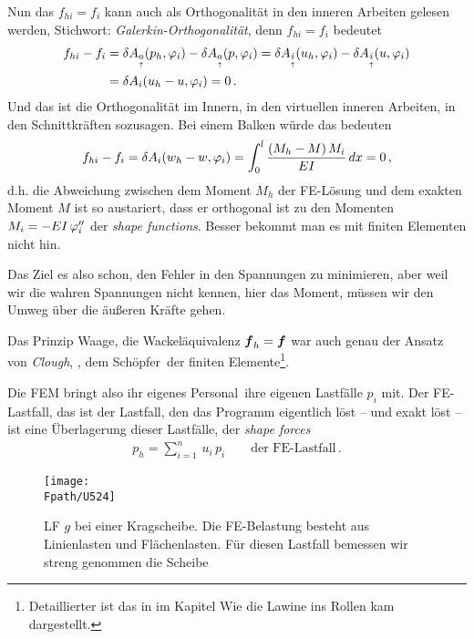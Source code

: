 Nun das $f_{hi} = f_i$ kann auch als Orthogonalit\"{a}t in den inneren Arbeiten gelesen werden, Stichwort: {\em Galerkin-Orthogonalit\"{a}t\/}, denn $f_{hi} = f_i$ bedeutet
\begin{align}
f_{hi} - f_i &= \delta A_{\underset{\uparrow}{a}}(p_h,\varphi_i) - \delta A_{\underset{\uparrow}{a}}(p,\varphi_i) = \delta A_{\underset{\uparrow}{i}}(u_h,\varphi_i) - \delta A_{\underset{\uparrow}{i}}(u,\varphi_i) \nonumber \\
&= \delta A_i(u_h - u,\varphi_i) = 0 \,.
\end{align}
Und das ist die Orthogonalit\"{a}t im Innern, in den virtuellen inneren Arbeiten, in den Schnittkr\"{a}ften sozusagen. Bei einem Balken w\"{u}rde das bedeuten
\begin{align}
f_{hi} - f_i =\delta A_i(w_h - w,\varphi_i) = \int_{0}^{l} \frac{(M_h - M)\,M_i}{EI}\,dx = 0\,,
\end{align}
d.h. die Abweichung zwischen dem Moment $M_h $ der FE-L\"{o}sung und dem exakten Moment $M$ ist so austariert, dass er orthogonal ist zu den Momenten $M_i = - EI\,\varphi_i''$ der {\em shape functions\/}. Besser bekommt man es mit finiten Elementen nicht hin.

Das Ziel es also schon, den Fehler in den Spannungen zu minimieren, aber weil wir die wahren Spannungen nicht kennen, hier das Moment, m\"{u}ssen wir den Umweg \"{u}ber die \"{a}u{\ss}eren Kr\"{a}fte gehen.

Das Prinzip Waage, die \glq Wackel\"{a}quivalenz\grq{} $\mbox{\boldmath $f$}_h = \mbox{\boldmath $f$}$ war auch genau der Ansatz von {\em Clough\/}, \cite{Turner}, dem \glq Sch\"{o}pfer\grq\ der finiten Elemente\footnote{Detaillierter ist das in \cite{HaJa2} im Kapitel \glq Wie die Lawine ins Rollen kam\grq{} dargestellt.}.

Die FEM bringt also ihr \glq eigenes Personal\grq\, ihre eigenen Lastf\"{a}lle $p_i$ mit. Der FE-Lastfall, das ist der Lastfall, den das Programm eigentlich l\"{o}st -- und exakt l\"{o}st -- ist eine \"{U}berlagerung dieser Lastf\"{a}lle, der {\em shape forces\/}
\begin{align}
p_h = \sum_{i = 1}^n\,u_i\,p_{i} \qquad \text{der FE-Lastfall}\,.
\end{align}
\begin{figure}[tbp] \centering
\if {} \sidecaption \fi
\texttt{[image: \\Fpath/U524]}
\caption{LF $g$ bei einer Kragscheibe. Die FE-Belastung besteht aus Linienlasten und Fl\"{a}chenlasten. F\"{u}r diesen Lastfall bemessen wir streng genommen die Scheibe}
\label{U524}
\end{figure}%

